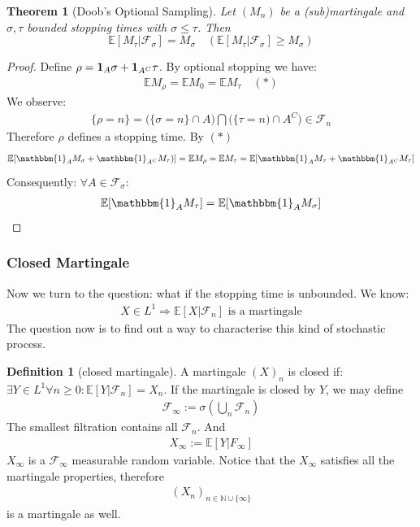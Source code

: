 \documentclass[a4paper,11pt]{book}
\newtheorem{theorem}{Theorem}[section]
\theoremstyle{definition}
\newtheorem{definition}{Definition}[section]
\theoremstyle{remark}
\begin{document}
\begin{theorem}[Doob's Optional Sampling]
	Let $(M_n)$ be a (sub)martingale and $\sigma, \tau$ bounded stopping times with $\sigma \leq \tau$. Then
	\begin{equation*}
		\mathbb{E}[M_\tau| \mathcal{F}_\sigma] = M_\sigma \quad (\mathbb{E}[M_\tau| \mathcal{F}_\sigma] \geq M_\sigma)
	\end{equation*}
\end{theorem}
\begin{proof}
	Define $\rho = \bold{1}_A \sigma + \bold{1}_{A^C} \tau$. By optional stopping we have:
	\begin{align*}
		\mathbb{E} M_\rho = \mathbb{E} M_0 = \mathbb{E} M_\tau \quad(*)
	\end{align*}
	We observe:
	\begin{align*}
		\{\rho = n \} = \bigg(\{\sigma = n\}\cap A \bigg)\bigcap\bigg(\{\tau = n) \cap A^C\bigg) \in \mathcal{F}_n
	\end{align*}
	Therefore $\rho$ defines a stopping time. By $(*)$ 
	\begin{align*}
		 \mathbb{E}[\mathbbm{1}_{A}M_\sigma + \mathbbm{1}_{A^C} M_\tau)]  = \mathbb{E}M_\rho =
		 \mathbb{E}M_\tau = \mathbb{E}[\mathbbm{1}_{A}M_\tau + \mathbbm{1}_{A^C} M_\tau]
	\end{align*}
		Consequently: $\forall A \in \mathcal{F}_\sigma:$
	\begin{align*}
		\mathbb{E}[\mathbbm{1}_{A} M_\tau ] = \mathbb{E}[\mathbbm{1}_{A}M_\sigma]
	\end{align*}

\end{proof}


\subsubsection*{Closed Martingale}
Now we turn to the question: what if the stopping time is unbounded.
We know:
\begin{align*}
 X \in L^1 \Rightarrow \mathbb{E}[X|\mathcal{F}_n]	\text{ is a martingale}
\end{align*}
The question now is to find out a way to characterise this kind of stochastic process.

\begin{definition}[closed martingale]
A martingale $(X)_n$ is closed if:
$\exists Y \in L^1 \forall n \geq 0: \mathbb{E}[Y|\mathcal{F}_n] = X_n$. 
If the martingale is closed by $Y$, we may define
\begin{align*}
	\mathcal{F}_\infty := \sigma(\bigcup_n \mathcal{F}_n)
\end{align*}
The smallest filtration contains all $\mathcal{F}_n$. And
\begin{align*}
		X_\infty:= \mathbb{E}[Y|F_\infty]
\end{align*}
$X_\infty$ is a $\mathcal{F}_\infty$ measurable random variable. Notice that the $X_\infty$ satisfies all the martingale properties, therefore
\begin{align*}
	(X_n)_{ n \in \mathbb{N} \cup \{\infty\}}
\end{align*}
is a martingale as well. 
\end{definition}
\end{document}
